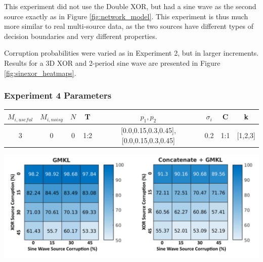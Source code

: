 \documentclass{article}
\begin{document}
This experiment did not use the Double XOR, but had a sine wave as the second
source exactly as in Figure \ref{fig:network_model}. This experiment is thus
much more similar to real multi-source data, as the two sources have different
types of decision boundaries and very different properties.

Corruption probabilities were varied as in Experiment 2, but in larger
increments. Results for a 3D XOR and 2-period sine wave are presented in Figure
\ref{fig:sinexor_heatmaps}.


\begin{minipage}{\textwidth}
\centering
\subsubsection*{Experiment 4 Parameters}
\begin{tabular}{|c|c|c|c|c|c|c|c|}
\hline
$M_{i,useful}$ & $M_{i, noisy}$ & $N$ & T &  $p_1, p_2$ & $\sigma_i$ & C &  k  \\
\hline
3 & 0 & 0 & 1:2 & [0.0,0.15,0.3,0.45],[0.0,0.15,0.3,0.45] & 0.2 & 1:1 & [1,2,3]  \\
\hline
\end{tabular}
\label{tab:exp_4_params}
\end{minipage}


\begin{minipage}{\textwidth}
    \centering
    \includegraphics[width=\textwidth]{SineXORCorrupt.png}
    \label{fig:sinexor_heatmaps}
\end{minipage}
\end{document}
